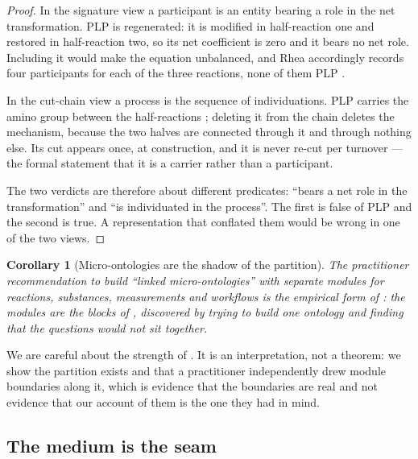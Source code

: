 \documentclass[11pt,twocolumn,a4paper]{article}
\theoremstyle{thmstyle}
\newtheorem{corollary}[theorem]{Corollary}
\theoremstyle{definition}
\theoremstyle{remark}
\begin{document}
\begin{proof}
In the signature view a participant is an entity bearing a role in the net
transformation. PLP is regenerated: it is modified in half-reaction one
and restored in half-reaction two, so its net coefficient is zero and it
bears no net role. Including it would make the equation unbalanced, and
Rhea accordingly records four participants for each of the three
reactions, none of them PLP \citep{bansal2022rhea,eliot2004transaminase}.

In the cut-chain view a process is the sequence of individuations. PLP
carries the amino group between the half-reactions
\citep{cleland1963kinetics,eliot2004transaminase}; deleting it from the
chain deletes the mechanism, because the two halves are connected through
it and through nothing else. Its cut appears once, at construction, and it
is never re-cut per turnover \citep{sachikonye2026pingpong}---the formal
statement that it is a carrier rather than a participant.

The two verdicts are therefore about different predicates: ``bears a net
role in the transformation'' and ``is individuated in the process''. The
first is false of PLP and the second is true. A representation that
conflated them would be wrong in one of the two views.
\end{proof}

\begin{corollary}[Micro-ontologies are the shadow of the partition]
\label{cor:micro}
The practitioner recommendation to build ``linked micro-ontologies'' with
separate modules for reactions, substances, measurements and workflows
\citep[slide~19]{doerr2025limits} is the empirical form of
: the modules are the blocks
of , discovered by trying to build one ontology and
finding that the questions would not sit together.
\end{corollary}

We are careful about the strength of . It is an
interpretation, not a theorem: we show the partition exists and that a
practitioner independently drew module boundaries along it, which is
evidence that the boundaries are real and not evidence that our account of
them is the one they had in mind.

\subsection{The medium is the seam}
\end{document}
